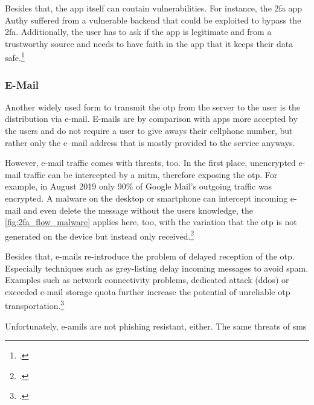  Besides that, the app itself can contain vulnerabilities. For instance, the \gls{2fa} app Authy suffered from a vulnerable backend that could be exploited to bypass the \gls{2fa}. Additionally, the user has to ask if the app is legitimate and from a trustworthy source and needs to have faith in the app that it keeps their data safe.\footcites[See][]{eset-bypass2fa}[See][]{sakurity-authy}
 
\subsubsection{E-Mail}

Another widely used form to transmit the \gls{otp} from the server to the user is the distribution via e-mail. E-mails are by comparison with apps more accepted by the users and do not require a user to give aways their cellphone number, but rather only the e--mail address that is mostly provided to the service anyways.

However, e-mail traffic comes with threats, too. In the first place, unencrypted e-mail traffic can be intercepted by a \gls{mitm}, therefore exposing the \gls{otp}. For example, in August 2019 only 90\% of Google Mail's outgoing traffic was encrypted. A malware on the desktop or smartphone can intercept incoming e-mail and even delete the message without the users knowledge, the \autoref{fig:2fa_flow_malware} applies here, too, with the variation that the \gls{otp} is not generated on the device but instead only received.\footcites[See][]{email-encryption}

Besides that, e-mails re-introduce the problem of delayed reception of the \gls{otp}. Especially techniques such as grey-listing delay incoming messages to avoid spam. Examples such as network connectivity problems, dedicated attack (\gls{ddos}) or exceeded e-mail storage quota further increase the potential of unreliable \gls{otp} transportation.\footcites[See][]{rfc6647}

Unfortunately, e-amils are not phishing resistant, either. The same threats of \gls{sms} 